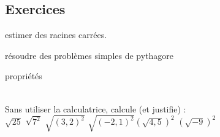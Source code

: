 \documentclass[main.tex]{subfiles}
\begin{document}
\subsection{Exercices}
estimer des racines carrées.



résoudre des problèmes simples de pythagore


propriétés


\begin{exercise}\hfill\\
	Sans utiliser la calculatrice, calcule (et justifie) :\\
	$\sqrt{25}$\hfill 		
	$\sqrt{7^2}$\hfill 		
	$\sqrt{(3,2)^2}$ \hfill  			
	$\sqrt{(-2,1)^2}$\hfill $\left(\sqrt{4,5}\right)^2$		
	\hfill$\left(\sqrt{-9}\right)^2$
\end{exercise}
\end{document}
